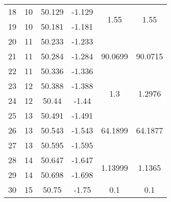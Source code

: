 \documentclass[twocolumn]{autart}
\begin{document}
\begin{table*}[t]
\begin{tabular}{cccccc}
    18    & 10    & 50.129 & -1.129 & \multirow{2}[4]{*}{1.55} & \multirow{2}[4]{*}{1.55} \\
    19    & 10    & 50.181 & -1.181 &       &  \\ \midrule
    20    & 11    & 50.233 & -1.233 & \multirow{3}[6]{*}{90.0699} & \multirow{3}[6]{*}{90.0715} \\
    21    & 11    & 50.284 & -1.284 &       &  \\
    22    & 11    & 50.336 & -1.336 &       &  \\  \midrule
    23    & 12    & 50.388 & -1.388 & \multirow{2}[4]{*}{1.3} & \multirow{2}[4]{*}{1.2976} \\
    24    & 12    & 50.44 & -1.44 &       &  \\  \midrule
    25    & 13    & 50.491 & -1.491 & \multirow{3}[6]{*}{64.1899} & \multirow{3}[6]{*}{64.1877} \\
    26    & 13    & 50.543 & -1.543 &       &  \\
    27    & 13    & 50.595 & -1.595 &       &  \\  \midrule
    28    & 14    & 50.647 & -1.647 & \multirow{2}[4]{*}{1.13999} & \multirow{2}[4]{*}{1.1365} \\
    29    & 14    & 50.698 & -1.698 &       &  \\ \midrule
    30    & 15    & 50.75 & -1.75 & 0.1   & 0.1 \\ 
    \bottomrule
    \end{tabular}\label{unequal_scenario_1}\end{table*}
\begin{table}[htbp]
  \centering
  \caption{Comparision of the results obtained for unequal distribution of fuel cell stacks in different rows using a standard optimization routine and the proposed algorithm. =75000 W,   	=0.8  		 Number of fuel cell stacks = 30. Parameters and optimum current drawn are described in Table \ref{unequal_scenario_1}.}
    \label{unequal_scenario_2}\end{table}
\end{document}
